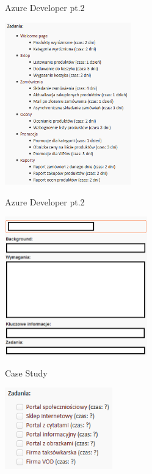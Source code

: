 \documentclass{beamer}
\begin{document}
\begin{frame}{Azure Developer pt.2}
	\begin{center}
		\includegraphics[height=7cm]{azure_developer_pt2_2.png}
	\end{center}
\end{frame}

\begin{frame}{Azure Developer pt.2}
	\begin{center}
		\includegraphics[height=6cm]{ad2_zadanie.PNG}
	\end{center}
\end{frame}

\begin{frame}{Case Study}
	\begin{center}
		\includegraphics[height=3.5cm]{case_study.PNG}
	\end{center}
\end{frame}
\end{document}
